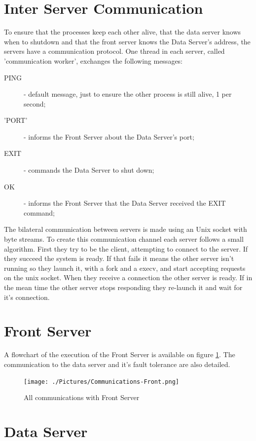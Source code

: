 \documentclass[12pt]{article} %
\begin{document}
\section{Inter Server Communication}
\label{sec:CommunicationProtocol}
To ensure that the processes keep each other alive, that the data server knows when 
to shutdown and  that the front server knows the Data Server's address, the servers 
have a communication protocol. One thread in each server, called 'communication 
worker', exchanges the following messages:
  \begin{description}
    \item[PING] - default message, just to ensure the other process is still alive, 1 per second;
    \item['PORT'] - informs the Front Server about the Data Server's port;
    \item[EXIT] - commands the Data Server to shut down;
    \item[OK] - informs the Front Server that the Data Server received the EXIT command;
  \end{description}

The bilateral communication between servers is made using an Unix socket with 
byte streams. To create this communication channel each server follows a small 
algorithm. First they try to be the client, attempting to connect to the server. 
If they succeed the system is ready. If that fails it means the other server isn't 
running so they launch it, with a fork and a execv, and start accepting requests 
on the unix socket. When they receive a connection the other server is ready. If 
in the mean time the other server stops responding they re-launch it and wait for 
it's connection.

\section{Front Server}
\label{sec:FrontServer}

A flowchart of the execution of the Front Server is available on figure \ref{fig:CommunicationsFront}. 
The communication to the data server and it's fault tolerance are also detailed.

\begin{figure}[ht]
\centering
\texttt{[image: ./Pictures/Communications-Front.png]}
\caption{All communications with Front Server}\label{fig:CommunicationsFront}
\end{figure}

\section{Data Server}
\label{sec:DataServer}
\end{document}
